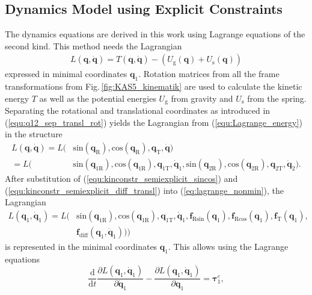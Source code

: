 \documentclass{svproc}
\newcommand{\bm}[1]{\boldsymbol{#1}}
\begin{document}
\subsection{Dynamics Model using Explicit Constraints}
\label{sec:Lagrange2Elim}

The dynamics equations are derived in this work using Lagrange equations of the second kind. This method needs the Lagrangian 
%
\begin{align}
L(\bm{q},\dot{\bm{q}}) = T(\bm{q},\dot{\bm{q}})-(U_{\mathrm{g}}(\bm{q})+U_{\mathrm{s}}(\bm{q}))
\label{equ:Lagrange_energy}
\end{align}
%
expressed in minimal coordinates $\bm{q}_{1}$.
Rotation matrices from all the frame transformations from Fig.\,\ref{fig:KAS5_kinematik} are used to calculate the kinetic energy $T$ as well as the potential energies $U_{\mathrm{g}}$ from gravity and $U_{\mathrm{s}}$ from the spring.
Separating the rotational and translational coordinates as introduced in (\ref{equ:q12_sep_transl_rot}) yields the Lagrangian from (\ref{equ:Lagrange_energy}) in the structure
%
\begin{align}
L(\bm{q},\dot{\bm{q}}) =L( & \mathrm{sin}  (\bm{q}_{\mathrm{R}}),\mathrm{cos}(\bm{q}_{\mathrm{R}}), \bm{q}_{\mathrm{T}},\dot{\bm{q}}) \\\label{eq:lagrange_nonmin}
=L( & \mathrm{sin}  (\bm{q}_{1\mathrm{R}}),\mathrm{cos}(\bm{q}_{1\mathrm{R}}), \bm{q}_{1\mathrm{T}},\dot{\bm{q}}_{1}, \mathrm{sin}  (\bm{q}_{2\mathrm{R}}),\mathrm{cos}(\bm{q}_{2\mathrm{R}}), \bm{q}_{2\mathrm{T}},\dot{\bm{q}}_{2}).
\end{align}
%
After substitution of (\ref{equ:kinconstr_semiexplicit_sincos}) and (\ref{equ:kinconstr_semiexplicit_diff_transl}) into (\ref{eq:lagrange_nonmin}), the Lagrangian 
%
\begin{align}
L(\bm{q}_1,\dot{\bm{q}}_1)=L( & \mathrm{sin} (\bm{q}_{1\mathrm{R}}),\mathrm{cos}(\bm{q}_{1\mathrm{R}}), \bm{q}_{1\mathrm{T}},\dot{\bm{q}}_{1}, \bm{f}_{\mathrm{R}\mathrm{sin}}(\bm{q}_1),
\bm{f}_{\mathrm{R}\mathrm{cos}}(\bm{q}_1),
\bm{f}_{\mathrm{T}}(\bm{q}_1),\\
& \bm{f}_{\mathrm{diff}}(\bm{q}_1,\dot{\bm{q}}_1))) \nonumber
\end{align}
%
is represented in the minimal coordinates $\bm{q}_1$.
This allows using the Lagrange equations
%
\begin{equation}
\frac{\mathrm{d}}{{\mathrm{d}}t}\frac{\partial L(\bm{q}_1,\dot{\bm{q}}_1)}{\partial \dot{\bm{q}}_1} - \frac{\partial L(\bm{q}_1,\dot{\bm{q}}_1)}{\partial \bm{q}_1}= \bm{\tau}^c_1,
\end{equation}
\end{document}
